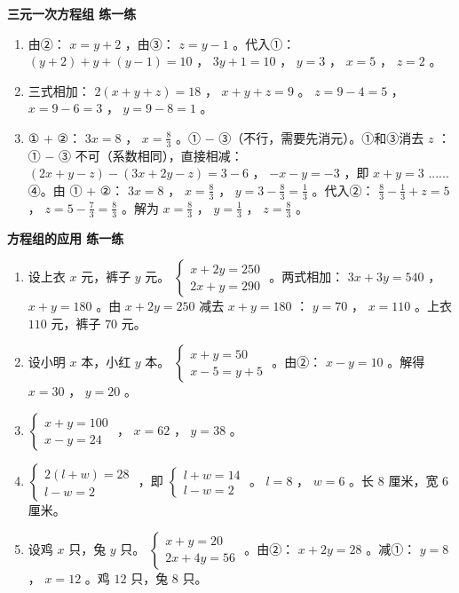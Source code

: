 \begin{answer}
\textbf{三元一次方程组 练一练}

\begin{enumerate}
  \item 由②： $x = y + 2$ ，由③： $z = y - 1$ 。代入①： $(y + 2) + y + (y - 1) = 10$ ， $3y + 1 = 10$ ， $y = 3$ ， $x = 5$ ， $z = 2$ 。
  \item 三式相加： $2(x + y + z) = 18$ ， $x + y + z = 9$ 。 $z = 9 - 4 = 5$ ， $x = 9 - 6 = 3$ ， $y = 9 - 8 = 1$ 。
  \item ① $+$ ②： $3x = 8$ ， $x = \frac{8}{3}$ 。① $-$ ③（不行，需要先消元）。①和③消去 $z$ ：① $-$ ③ 不可（系数相同），直接相减： $(2x + y - z) - (3x + 2y - z) = 3 - 6$ ， $-x - y = -3$ ，即 $x + y = 3$ ...... ④。由 ① $+$ ②： $3x = 8$ ， $x = \frac{8}{3}$ ， $y = 3 - \frac{8}{3} = \frac{1}{3}$ 。代入②： $\frac{8}{3} - \frac{1}{3} + z = 5$ ， $z = 5 - \frac{7}{3} = \frac{8}{3}$ 。解为 $x = \frac{8}{3}$ ， $y = \frac{1}{3}$ ， $z = \frac{8}{3}$ 。
\end{enumerate}


\textbf{方程组的应用 练一练}

\begin{enumerate}
  \item 设上衣 $x$ 元，裤子 $y$ 元。 $\begin{cases} x + 2y = 250 \\ 2x + y = 290 \end{cases}$ 。两式相加： $3x + 3y = 540$ ， $x + y = 180$ 。由 $x + 2y = 250$ 减去 $x + y = 180$ ： $y = 70$ ， $x = 110$ 。上衣 $110$ 元，裤子 $70$ 元。
  \item 设小明 $x$ 本，小红 $y$ 本。 $\begin{cases} x + y = 50 \\ x - 5 = y + 5 \end{cases}$ 。由②： $x - y = 10$ 。解得 $x = 30$ ， $y = 20$ 。
  \item $\begin{cases} x + y = 100 \\ x - y = 24 \end{cases}$ ， $x = 62$ ， $y = 38$ 。
  \item $\begin{cases} 2(l + w) = 28 \\ l - w = 2 \end{cases}$ ，即 $\begin{cases} l + w = 14 \\ l - w = 2 \end{cases}$ 。 $l = 8$ ， $w = 6$ 。长 $8$ 厘米，宽 $6$ 厘米。
  \item 设鸡 $x$ 只，兔 $y$ 只。 $\begin{cases} x + y = 20 \\ 2x + 4y = 56 \end{cases}$ 。由②： $x + 2y = 28$ 。减①： $y = 8$ ， $x = 12$ 。鸡 $12$ 只，兔 $8$ 只。
\end{enumerate}


\end{answer}

